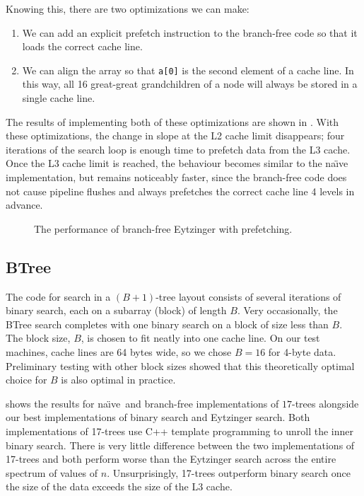 \documentclass{patmorin}
\newcommand{\naive}{na\"{\i}ve}
\begin{document}
Knowing this, there are two optimizations we can make:
\begin{enumerate}
  \item We can add an explicit prefetch instruction to the branch-free code
    so that it loads the correct cache line.
  \item We can align the array so that \texttt{a[0]} is the
    second element of a cache line.  In this way, all 16 great-great
    grandchildren of a node will always be stored in a single cache line.
\end{enumerate}

The results of implementing both of these optimizations are shown in
.  With these optimizations, the change in slope
at the L2 cache limit disappears; four iterations of the search loop
is enough time to prefetch data from the L3 cache.  Once the L3 cache
limit is reached, the behaviour becomes similar to the \naive
implementation, but remains noticeably faster, since the branch-free
code does not cause pipeline flushes and always prefetches the correct
cache line 4 levels in advance.

\begin{figure}
   \caption{The performance of branch-free Eytzinger with prefetching.}
\end{figure}

\subsection{BTree}

The code for search in a $(B+1)$-tree layout consists of several
iterations of binary search, each on a subarray (block) of length
$B$. Very occasionally, the BTree search completes with one binary search
on a block of size less than $B$. The block size, $B$, is chosen to fit
neatly into one cache line. On our test machines, cache lines are 64
bytes wide, so we chose $B=16$ for 4-byte data. Preliminary testing with
other block sizes showed that this theoretically optimal choice for $B$
is also optimal in practice.

 shows the results for \naive\ and branch-free
implementations of $17$-trees alongside our best implementations of binary
search and Eytzinger search.  Both implementations of 17-trees use C++
template programming to unroll the inner binary search.  There is very
little difference between the two implementations of 17-trees and both
perform worse than the Eytzinger search across the entire spectrum of
values of $n$. Unsurprisingly, 17-trees outperform binary search once
the size of the data exceeds the size of the L3 cache.
\end{document}
